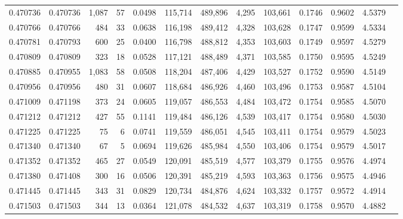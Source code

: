 \begin{tabular}{rrrrrrrrrrrrr}
0.470736 & 0.470736 & 1,087 &    57 &                                     0.0498 & 115,714 & 489,896 &   4,295 & 103,661 & 0.1746 & 0.9602 & 4.5379 \\
0.470766 & 0.470766 &   484 &    33 &                                     0.0638 & 116,198 & 489,412 &   4,328 & 103,628 & 0.1747 & 0.9599 & 4.5334 \\
0.470781 & 0.470793 &   600 &    25 &                                     0.0400 & 116,798 & 488,812 &   4,353 & 103,603 & 0.1749 & 0.9597 & 4.5279 \\
0.470809 & 0.470809 &   323 &    18 &                                     0.0528 & 117,121 & 488,489 &   4,371 & 103,585 & 0.1750 & 0.9595 & 4.5249 \\
0.470885 & 0.470955 & 1,083 &    58 &                                     0.0508 & 118,204 & 487,406 &   4,429 & 103,527 & 0.1752 & 0.9590 & 4.5149 \\
0.470956 & 0.470956 &   480 &    31 &                                     0.0607 & 118,684 & 486,926 &   4,460 & 103,496 & 0.1753 & 0.9587 & 4.5104 \\
0.471009 & 0.471198 &   373 &    24 &                                     0.0605 & 119,057 & 486,553 &   4,484 & 103,472 & 0.1754 & 0.9585 & 4.5070 \\
0.471212 & 0.471212 &   427 &    55 &                                     0.1141 & 119,484 & 486,126 &   4,539 & 103,417 & 0.1754 & 0.9580 & 4.5030 \\
0.471225 & 0.471225 &    75 &     6 &                                     0.0741 & 119,559 & 486,051 &   4,545 & 103,411 & 0.1754 & 0.9579 & 4.5023 \\
0.471340 & 0.471340 &    67 &     5 &                                     0.0694 & 119,626 & 485,984 &   4,550 & 103,406 & 0.1754 & 0.9579 & 4.5017 \\
0.471352 & 0.471352 &   465 &    27 &                                     0.0549 & 120,091 & 485,519 &   4,577 & 103,379 & 0.1755 & 0.9576 & 4.4974 \\
0.471380 & 0.471408 &   300 &    16 &                                     0.0506 & 120,391 & 485,219 &   4,593 & 103,363 & 0.1756 & 0.9575 & 4.4946 \\
0.471445 & 0.471445 &   343 &    31 &                                     0.0829 & 120,734 & 484,876 &   4,624 & 103,332 & 0.1757 & 0.9572 & 4.4914 \\
0.471503 & 0.471503 &   344 &    13 &                                     0.0364 & 121,078 & 484,532 &   4,637 & 103,319 & 0.1758 & 0.9570 & 4.4882 \\

\end{tabular}
